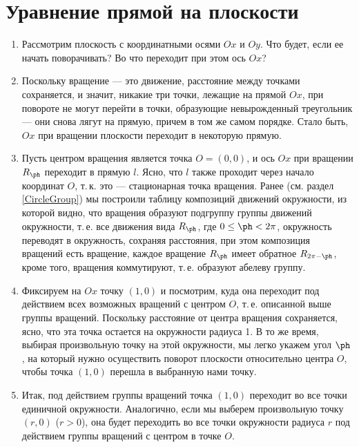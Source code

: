 
\section{Уравнение прямой на плоскости}


\begin{enumerate}
\item Рассмотрим плоскость с координатными осями $Ox$ и $Oy$. Что будет, если ее начать поворачивать? Во что переходит при этом ось $Ox$?
\item Поскольку вращение --- это движение, расстояние между точками сохраняется, и значит, никакие три точки, лежащие на прямой $Ox$, при повороте не могут перейти в точки, образующие невырожденный треугольник --- они снова лягут на прямую, причем в том же самом порядке. Стало быть, $Ox$ при вращении плоскости переходит в некоторую прямую.
\item Пусть центром вращения является точка $O=(0,0)$, и ось $Ox$ при вращении $R_\ph$ переходит в прямую $l$. Ясно, что $l$ также проходит через начало координат $O$, т.\,к. это --- стационарная точка вращения. Ранее (см. раздел \ref{CircleGroup}) мы построили таблицу композиций движений окружности, из которой видно, что вращения образуют подгруппу группы движений окружности, т.\,е. все движения вида $R_\ph$, где $0\le\ph<2\pi$, окружность переводят в окружность, сохраняя расстояния, при этом композиция вращений есть вращение, каждое вращение $R_\ph$ имеет обратное $R_{2\pi-\ph}$, кроме того, вращения коммутируют, т.\,е. образуют абелеву группу.
\item Фиксируем на $Ox$ точку $(1,0)$ и посмотрим, куда она переходит под действием всех возможных вращений с центром $O$, т.\,е. описанной выше группы вращений. Поскольку расстояние от центра вращения сохраняется, ясно, что эта точка остается на окружности радиуса 1. В то же время, выбирая произвольную точку на этой окружности, мы легко укажем угол $\ph$, на который нужно осуществить поворот плоскости относительно центра $O$, чтобы точка $(1,0)$ перешла в выбранную нами точку.
\item Итак, под действием группы вращений точка $(1,0)$ переходит во все точки единичной окружности. Аналогично, если мы выберем произвольную точку $(r,0)$ ($r>0$), она будет переходить во все точки окружности радиуса $r$ под действием группы вращений с центром в точке $O$.

\end{enumerate}
